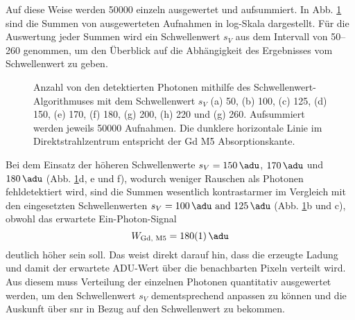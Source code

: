 \noindent
Auf diese Weise werden \SI{50000}{\captures} einzeln ausgewertet und aufsummiert. In Abb. \ref{fig:th_50_100_125_150_170_180_200_220_260} sind die Summen von ausgewerteten Aufnahmen in log-Skala dargestellt. Für die Auswertung jeder Summen wird ein Schwellenwert $s_V$ aus dem Intervall von \SIrange{50}{260}{\adu} genommen, um den Überblick auf die Abhängigkeit des Ergebnisses vom Schwellenwert zu geben.
\begin{figure}[H]
    \centering
    
    \caption{Anzahl von den detektierten Photonen mithilfe des Schwellenwert-Algorithmuses mit dem Schwellenwert $s_V$ (a) \SI{50}{\adu}, (b) \SI{100}{\adu}, (c) \SI{125}{\adu}, (d) \SI{150}{\adu}, (e) \SI{170}{\adu}, (f) \SI{180}{\adu}, (g) \SI{200}{\adu}, (h) \SI{220}{\adu} und (g) \SI{260}{\adu}. Aufsummiert werden jeweils \num{50000} Aufnahmen. Die dunklere horizontale Linie im Direktstrahlzentrum entspricht der Gd M5 Absorptionskante.}
    \label{fig:th_50_100_125_150_170_180_200_220_260}
\end{figure}
\noindent
Bei dem Einsatz der höheren Schwellenwerte $s_V = \SI{150}{\adu}$, $\SI{170}{\adu}$ und $\SI{180}{\adu}$ (Abb. \ref{fig:th_50_100_125_150_170_180_200_220_260}d, e und f), wodurch weniger Rauschen als Photonen fehldetektiert wird, sind die Summen wesentlich kontrastarmer im Vergleich mit den eingesetzten Schwellenwerten $s_V = \qtylist{100;125}{\adu}$ (Abb. \ref{fig:th_50_100_125_150_170_180_200_220_260}b und c), obwohl das erwartete Ein-Photon-Signal
 \begin{equation}
    W_\text{Gd, M5} = \SI{180(1)}{\adu}
\end{equation}
deutlich höher sein soll. Das weist direkt darauf hin, dass die erzeugte Ladung und damit der erwartete ADU-Wert über die benachbarten Pixeln verteilt wird. Aus diesem muss Verteilung der einzelnen Photonen quantitativ ausgewertet werden, um den Schwellenwert $s_V$ dementsprechend anpassen zu können und die Auskunft über \gls{snr} in Bezug auf den Schwellenwert zu bekommen.

